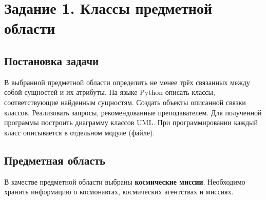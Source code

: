 \documentclass[a4paper,14pt]{extarticle}
\begin{document}
\section{Задание 1. Классы предметной области}

\subsection{Постановка задачи}

В выбранной предметной области определить не менее трёх связанных между собой сущностей и их атрибуты. На языке Python описать классы, соответствующие найденным сущностям. Создать объекты описанной связки классов. Реализовать запросы, рекомендованные преподавателем. Для полученной программы построить диаграмму классов UML. При программировании каждый класс описывается в отдельном модуле (файле).

\subsection{Предметная область}

В качестве предметной области выбраны \textbf{космические миссии}. Необходимо хранить информацию о космонавтах, космических агентствах и миссиях.
\end{document}
